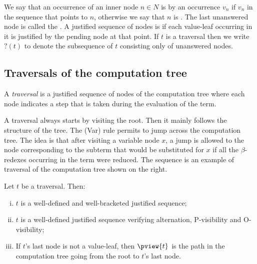 We say that an occurrence of an inner node $n \in N$ is
 by an occurrence $v_n$ if $v_n$ in
the sequence that points to $n$, otherwise we say that $n$ is
. The last unanswered node is called the
.  A justified sequence of nodes is
 if each value-leaf occurring in it is justified by the pending node at that point.  If $t$ is a traversal then we write
$?(t)$ to denote the subsequence of $t$ consisting only of unanswered nodes.

\subsection{Traversals of the computation tree}
\label{subsec:traversal}

A \emph{traversal} is a justified sequence of nodes of the computation tree where each node indicates a step that is taken during the evaluation of the term.



 A traversal always starts by visiting the root. Then it mainly follows the structure of the tree. The (Var) rule permits to jump across the computation tree. The idea is that after visiting a variable node $x$, a jump is allowed to the node corresponding to the subterm that would be substituted for $x$ if all the $\beta$-redexes occurring in the term were reduced. The sequence 
 is an example of traversal of the computation tree shown on the right.

\begin{proposition}
\label{prop:pviewtrav_is_path} Let $t$ be a traversal. Then:
\begin{enumerate}[(i)]
\item $t$ is a well-defined and well-bracketed justified sequence;
\item $t$ is a well-defined justified sequence verifying alternation, P-visibility and O-visibility;
\item If $t$'s last node is not a value-leaf, then $\pview{t}$ is the path in the computation tree going from the root to $t$'s last node.
\end{enumerate}
\end{proposition}

